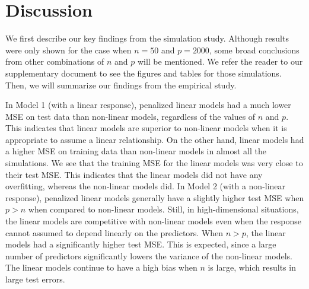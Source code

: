 \documentclass[final,onefignum,onetabnum]{siuro210301}
\begin{document}

	
	\newpage
	\section{Discussion}\label{sec:discussion}
	
	We first describe our key findings from the simulation study. Although results were only shown for the case when $n = 50$ and $p = 2000$, some broad conclusions from other combinations of $n$ and $p$ will be mentioned. We refer the reader to our supplementary document to see the figures and tables for those simulations. Then, we will summarize our findings from the empirical study.
	
	In Model 1 (with a linear response), penalized linear models had a much lower MSE on test data than non-linear models, regardless of the values of $n$ and $p$. This indicates that linear models are superior to non-linear models when it is appropriate to assume a linear relationship. On the other hand, linear models had a higher MSE on training data than non-linear models in almost all the simulations. We see that the training MSE for the linear models was very close to their test MSE. This indicates that the linear models did not have any overfitting, whereas the non-linear models did. In Model 2 (with a non-linear response), penalized linear models generally have a slightly higher test MSE when $p > n$ when compared to non-linear models. Still, in high-dimensional situations, the linear models are competitive with non-linear models even when the response cannot assumed to depend linearly on the predictors. When $n > p$, the linear models had a significantly higher test MSE. This is expected, since a large number of predictors significantly lowers the variance of the non-linear models. The linear models continue to have a high bias when $n$ is large, which results in large test errors.
	
\end{document}
